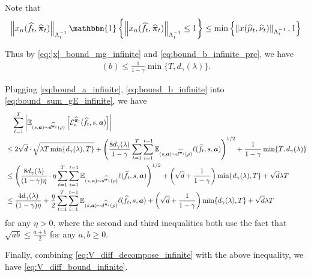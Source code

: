 Note that 
$$\norm{x_n(\widehat{f}_t,\widehat{\vpi}_t)}_{\Lambda_{t}^{-1}}\mathbbm{1}\left\{\norm{x_n(\widehat{f}_t,\widehat{\vpi}_t)}_{\Lambda_{t}^{-1}}\leq 1\right\}\leq \min\left\{ \norm{x(\widehat{\mu}_t,\widehat{\nu}_t)}_{\Lambda_{t}^{-1}},1\right\}$$

Thus by \eqref{eq:|x|_bound_mg_infinite} and \eqref{eq:bound_b_infinite_pre}, we have
\begin{align}\label{eq:bound_b_infinite}
    (b)\leq \frac{1}{1-\gamma} \min\{T, d_\gamma(\lambda)\}.
\end{align}


Plugging \eqref{eq:bound_a_infinite}, \eqref{eq:bound_b_infinite} into \eqref{eq:bound_sum_gE_infinite}, we have
\begin{align}
&\quad\sum_{t=1}^T \left| \mathbb{E}_{(s,{\bm{a}})\sim d^{\widehat{{\bm{\pi}}}_t}(\rho)}\left[{\mathcal{E}}_n^{\widehat{{\bm{\pi}}}_t}(\widehat{f}_t,s,{\bm{a}})\right]\right|\notag\\
&\leq 2\sqrt{d}\cdot\sqrt{\lambda T \min\{d_\gamma(\lambda),T\}} + \left(\frac{8d_\gamma(\lambda)}{1-\gamma}\sum_{t=1}^T \sum_{i=1}^{t-1} \mathbb{E}_{(s,{\bm{a}})\sim d^{\widehat{{\bm{\pi}}}_i}(\rho)}\ell(\widehat{f}_t,s,{\bm{a}})\right)^{1/2}+\frac{1}{1-\gamma} \min\{T, d_\gamma(\lambda)\}\notag\\
&\leq \left(\frac{8d_\gamma(\lambda)}{(1-\gamma)\eta}\cdot\eta\sum_{t=1}^T \sum_{i=1}^{t-1}  \mathbb{E}_{(s,{\bm{a}})\sim d^{\widehat{{\bm{\pi}}}_i}(\rho)}\ell(\widehat{f}_t,s,{\bm{a}})\right)^{1/2} + \left(\sqrt{d}+\frac{1}{1-\gamma}\right) \min\{d_\gamma(\lambda),T\} +\sqrt{d} \lambda T\notag\\
&\leq \frac{4d_\gamma(\lambda)}{(1-\gamma)\eta} +\frac{\eta}{2}\sum_{t=1}^T \sum_{i=1}^{t-1} \mathbb{E}_{(s,{\bm{a}})\sim d^{\widehat{{\bm{\pi}}}_i}(\rho)}\ell(\widehat{f}_t,s,{\bm{a}}) + \left(\sqrt{d}+\frac{1}{1-\gamma}\right) \min\{d_\gamma(\lambda),T\} +\sqrt{d} \lambda T
\end{align}
for any $\eta>0$, where the second and third inequalities both use the fact that $\sqrt{ab}\leq \frac{a+b}{2}$ for any $a,b\geq 0$. 

Finally, combining \eqref{eq:V_diff_decompose_infinite} with the above inequality, we have \eqref{eq:V_diff_bound_infinite}.